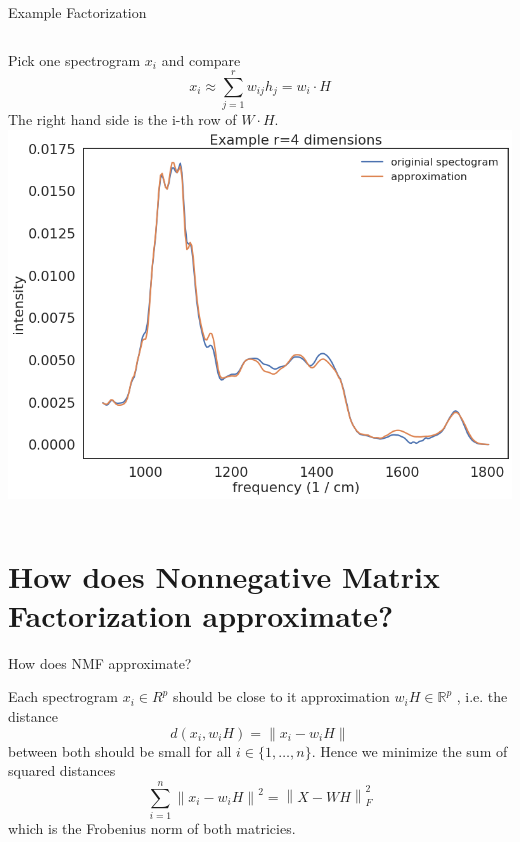 \documentclass[aspectratio=169]{beamer}
\begin{document}
\begin{frame}{Example Factorization}

	\begin{columns}
			Pick one spectrogram $x_i$ and compare
			\begin{equation*}
			x_i \approx \sum_{j=1}^{r} w_{i j } h_{j} = w_i \cdot H
			\end{equation*}
			The right hand side is the i-th row of $W \cdot H$.
			\includegraphics[width=\linewidth]{images/original_approx.png}
	\end{columns}
\end{frame}

\section{How does Nonnegative Matrix Factorization approximate?}

\begin{frame}{How does NMF approximate?}

Each spectrogram $x_i \in R^p$ should be close to it approximation $w_i H \in \mathbb{R}^p $  , i.e. the distance 
\begin{equation*}
d(x_i, w_i  H) = \left\lVert x_i - w_i  H \right\rVert 
\end{equation*}
between both should be small for all $ i  \in \{ 1, \dots , n \} $. Hence we minimize the sum of squared distances 
\begin{equation*}
\sum_{i = 1}^{n} \left\lVert x_i - w_i H\right\rVert^2  = \left\lVert X - W H\right\rVert^2_F
\end{equation*}
which is the Frobenius norm of both matricies.
\end{frame}
\end{document}

